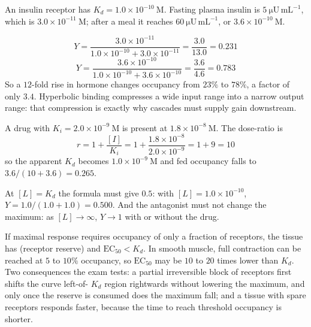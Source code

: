 \begin{calcbox}[title={WORKED: occupancy, potency and a shifted curve}]
An insulin receptor has $K_d = 1.0\times10^{-10}\ \mathrm{M}$. Fasting plasma insulin
is $5\ \mathrm{\mu U\,mL^{-1}}$, which is $3.0\times10^{-11}\ \mathrm{M}$; after a
meal it reaches $60\ \mathrm{\mu U\,mL^{-1}}$, or
$3.6\times10^{-10}\ \mathrm{M}$.

\[
Y=\frac{3.0\times10^{-11}}{1.0\times10^{-10}+3.0\times10^{-11}}
=\frac{3.0}{13.0}=0.231
\]
\[
Y=\frac{3.6\times10^{-10}}{1.0\times10^{-10}+3.6\times10^{-10}}
=\frac{3.6}{4.6}=0.783
\]
So a $12$-fold rise in hormone changes occupancy from $23\%$ to $78\%$, a factor of
only $3.4$. Hyperbolic binding compresses a wide input range into a narrow output
range: that compression is exactly why cascades must supply gain downstream.

 A drug with $K_i=2.0\times10^{-9}\ \mathrm{M}$
is present at $1.8\times10^{-8}\ \mathrm{M}$. The dose-ratio is
\[
r=1+\frac{[I]}{K_i}=1+\frac{1.8\times10^{-8}}{2.0\times10^{-9}}=1+9=10
\]
so the apparent $K_d$ becomes $1.0\times10^{-9}\ \mathrm{M}$ and fed occupancy falls
to $3.6/(10+3.6)=0.265$.

 At $[L]=K_d$ the formula must give $0.5$: with
$[L]=1.0\times10^{-10}$, $Y=1.0/(1.0+1.0)=0.500$. \tm{$\surd$} And the antagonist
must not change the maximum: as $[L]\rightarrow\infty$, $Y\rightarrow 1$ with or
without the drug. \tm{$\surd$}
\end{calcbox}

\begin{thmbox}[title={PRINCIPLE: spare receptors uncouple $\mathrm{EC_{50}}$ from $K_d$}]
If maximal response requires occupancy of only a fraction of receptors, the tissue has
 (receptor reserve) and $\mathrm{EC_{50}} < K_d$. In smooth
muscle, full contraction can be reached at $5$ to $10\%$ occupancy, so
$\mathrm{EC_{50}}$ may be $10$ to $20$ times lower than $K_d$. Two consequences the
exam tests: a partial irreversible block of receptors first shifts the curve left-of-
$K_d$ region rightwards without lowering the maximum, and only once the reserve is
consumed does the maximum fall; and a tissue with spare receptors responds faster,
because the time to reach threshold occupancy is shorter.
\end{thmbox}

